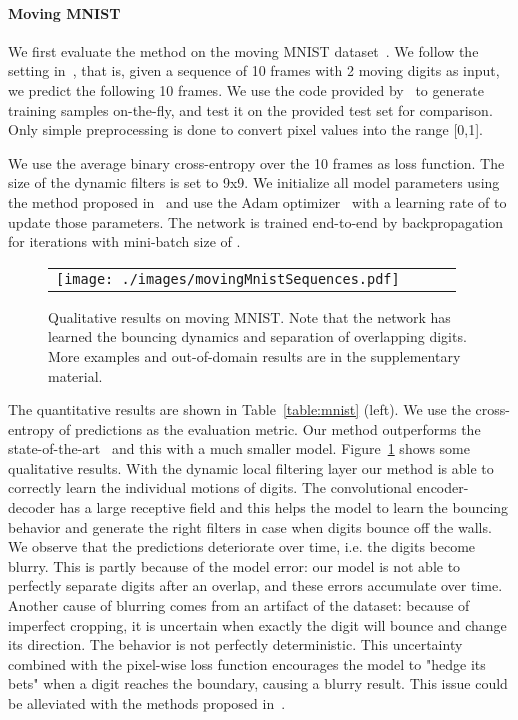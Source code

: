 \paragraph{Moving MNIST}
We first evaluate the method on the moving MNIST dataset~\cite{Srivastava-ICML15}. 
We follow the setting in~\cite{Srivastava-ICML15}, that is, given a sequence of 10 frames with 2 moving digits as input, we predict the following 10 frames. 
We use the code provided by~\cite{Srivastava-ICML15} to generate training samples on-the-fly, and test it on the provided test set for comparison.
Only simple preprocessing is done to convert pixel values into the range [0,1].

We use the average binary cross-entropy over the 10 frames as loss function.
The size of the dynamic filters is set to 9x9. 
We initialize all model parameters using the method proposed in~\cite{He-ICCV15} and use the Adam optimizer~\cite{adam} with a learning rate of  to update those parameters. 
The network is trained end-to-end by backpropagation for  iterations with mini-batch size of .
\begin{figure}
	\centering
	\begin{tabular}{cccc}
		\texttt{[image: ./images/movingMnistSequences.pdf]}
	\end{tabular}
	\caption{\small Qualitative results on moving MNIST. Note that the network has learned the bouncing dynamics and separation of overlapping digits. More examples and out-of-domain results are in the supplementary material.}
	\label{fig:movingMnistSequences}
\end{figure}
The quantitative results are shown in Table~\ref{table:mnist} (left). We use the cross-entropy of predictions as the evaluation metric. Our method outperforms the state-of-the-art~\cite{Srivastava-ICML15, Shi-NIPS15} and this with a much smaller model. Figure~\ref{fig:movingMnistSequences} shows some qualitative results. With the dynamic local filtering layer our method is able to correctly learn the individual motions of digits.
The convolutional encoder-decoder has a large receptive field and this helps the model to learn the bouncing behavior and generate the right filters in case when digits bounce off the walls.
We observe that the predictions deteriorate over time, i.e. the digits become blurry. 
This is partly because of the model error: our model is not able to perfectly separate digits after an overlap, and these errors accumulate over time.
Another cause of blurring comes from an artifact of the dataset: because of imperfect cropping, it is uncertain when exactly the digit will bounce and change its direction. The behavior is not perfectly deterministic. This uncertainty combined with the pixel-wise loss function encourages the model to "hedge its bets" when a digit reaches the boundary, causing a blurry result.
This issue could be alleviated with the methods proposed in~\cite{Goodfellow-NIPS14,Goroshin-NIPS15,Larsen-ICML16}.

